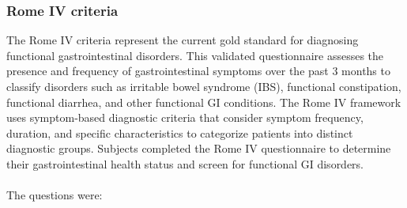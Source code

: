 \documentclass[10pt]{article}
\begin{document}
\subsubsection{Rome IV criteria}

The Rome IV criteria represent the current gold standard for diagnosing functional gastrointestinal disorders. This validated questionnaire assesses the presence and frequency of gastrointestinal symptoms over the past 3 months to classify disorders such as irritable bowel syndrome (IBS), functional constipation, functional diarrhea, and other functional GI conditions. The Rome IV framework uses symptom-based diagnostic criteria that consider symptom frequency, duration, and specific characteristics to categorize patients into distinct diagnostic groups. Subjects completed the Rome IV questionnaire to determine their gastrointestinal health status and screen for functional GI disorders.
\\ \\
The questions were:
\end{document}
